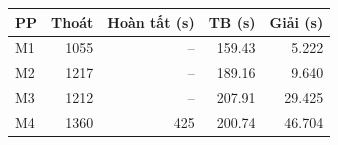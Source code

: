\begin{center}\small
\begin{tabular}{lrrrr}
\toprule
PP & Thoát & Hoàn tất (s) & TB (s) & Giải (s)\\\midrule
M1 & 1055 & -- & 159.43 & 5.222\\
M2 & 1217 & -- & 189.16 & 9.640\\
M3 & 1212 & -- & 207.91 & 29.425\\
M4 & 1360 & 425 & 200.74 & 46.704\\
\bottomrule\end{tabular}\end{center}